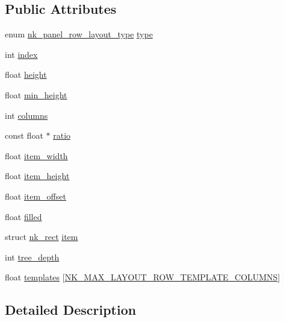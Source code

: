 \subsection*{Public Attributes}
\begin{DoxyCompactItemize}
\item 
enum \mbox{\hyperlink{nuklear_8h_a1bf6dfb8e793214e8bda8282721e2476}{nk\+\_\+panel\+\_\+row\+\_\+layout\+\_\+type}} \mbox{\hyperlink{structnk__row__layout_a41de8f5afc0197c0bef11e4ec7d621e3}{type}}
\item 
int \mbox{\hyperlink{structnk__row__layout_a2f67dbabb90fc669f89d146b72096214}{index}}
\item 
float \mbox{\hyperlink{structnk__row__layout_a0d4150f39d7902658889b3eca96eda1b}{height}}
\item 
float \mbox{\hyperlink{structnk__row__layout_a49e13ff37672b2ca384f934c81fa3150}{min\+\_\+height}}
\item 
int \mbox{\hyperlink{structnk__row__layout_a16f13d53cf3159bea36cf8297828296c}{columns}}
\item 
const float $\ast$ \mbox{\hyperlink{structnk__row__layout_ade0fedd4bed112aee70a65ab4adcc584}{ratio}}
\item 
float \mbox{\hyperlink{structnk__row__layout_a9bed03da7c7e09d8acbcd40ea868a1a0}{item\+\_\+width}}
\item 
float \mbox{\hyperlink{structnk__row__layout_a6b49798d8a6212635e6ff43ff18ff1b3}{item\+\_\+height}}
\item 
float \mbox{\hyperlink{structnk__row__layout_aed3b80106355700ff3c6f2b48955417a}{item\+\_\+offset}}
\item 
float \mbox{\hyperlink{structnk__row__layout_a100754dddcc6831144d57ce946d0b0cc}{filled}}
\item 
struct \mbox{\hyperlink{structnk__rect}{nk\+\_\+rect}} \mbox{\hyperlink{structnk__row__layout_a9cf7d946ac238a1d740b30274c94d0c6}{item}}
\item 
int \mbox{\hyperlink{structnk__row__layout_a4bc8a0292d154b34cd9b78b821a02961}{tree\+\_\+depth}}
\item 
float \mbox{\hyperlink{structnk__row__layout_ad73df5ad8ed8958a89920efa10dcdb70}{templates}} \mbox{[}\mbox{\hyperlink{nuklear_8h_a84cf276eb1ea1d22a51706df4d2c5e28}{N\+K\+\_\+\+M\+A\+X\+\_\+\+L\+A\+Y\+O\+U\+T\+\_\+\+R\+O\+W\+\_\+\+T\+E\+M\+P\+L\+A\+T\+E\+\_\+\+C\+O\+L\+U\+M\+NS}}\mbox{]}
\end{DoxyCompactItemize}


\subsection{Detailed Description}


